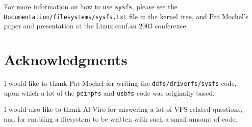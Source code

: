 \documentclass[twocolumn]{article}
\begin{document}
For more information on how to use {\tt sysfs}, please see the {\tt
Documentation/filesystems/sysfs.txt} file in the kernel tree, and Pat
Mochel's paper and presentation at the Linux.conf.au 2003 conference.


\section{Acknowledgments}

I would like to thank Pat Mochel for writing the {\tt ddfs/driverfs/sysfs}
code, upon which a lot of the {\tt pcihpfs} and {\tt usbfs} code was
originally based.

I would also like to thank Al Viro for answering a lot of VFS related
questions, and for enabling a filesystem to be written with such a small
amount of code.
\end{document}
